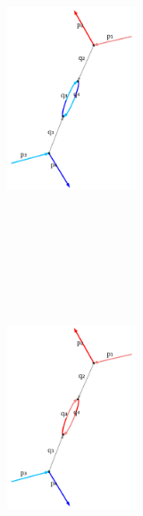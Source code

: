 \documentclass[
  11pt,
  a4paper,
  DIV=11,
  numbers=noendperiod,
  twoside]{scrreprt}
\DeclareRobustCommand{\[}{\begin{equation}}
\DeclareRobustCommand{\]}{\end{equation}}
\begin{document}
\begin{figure}
\begin{minipage}[t]{0.25\linewidth}
{\begin{figure}[H]
{}

\end{figure}

}

\end{minipage}%
%
\begin{minipage}[t]{0.25\linewidth}

{\centering 

\begin{figure}[H]

{\centering \includegraphics[width=1.5in,height=3.5in]{./scattering_files/figure-latex/dot-figure-12.png}

}

\end{figure}

}

\end{minipage}%
%
\begin{minipage}[t]{0.25\linewidth}

{\centering 

\begin{figure}[H]

{\centering \includegraphics[width=1.5in,height=3.5in]{./scattering_files/figure-latex/dot-figure-11.png}

}
\end{figure}}
\end{minipage}
\end{figure}
\end{document}
